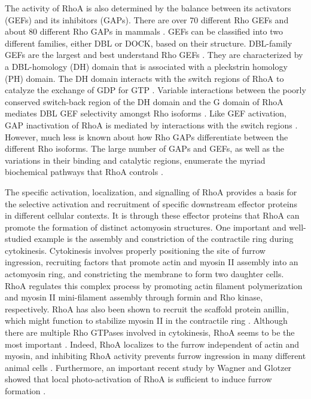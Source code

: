 \documentclass{ucetd}
\begin{document}
The activity of RhoA is also determined by the balance between its activators (GEFs) and its inhibitors (GAPs).  There are over 70 different Rho GEFs and about 80 different Rho GAPs in mammals \cite{Cherfils:2013ks}.  GEFs can be classified into two different families, either DBL or DOCK, based on their structure.  DBL-family GEFs are the largest and best understand Rho GEFs \cite{Rossman:2005do}.  They are characterized by a DBL-homology (DH) domain that is associated with a pleckstrin homology (PH) domain.  The DH domain interacts with the switch regions of RhoA to catalyze the exchange of GDP for GTP \cite{Rossman:2005do}.  Variable interactions between the poorly conserved switch-back region of the DH domain and the G domain of RhoA mediates DBL GEF selectivity amongst Rho isoforms \cite{Rossman:2005do, Schaefer:2014ez}.  Like GEF activation, GAP inactivation of RhoA is mediated by interactions with the switch regions \cite{Cherfils:2013ks}.  However, much less is known about how Rho GAPs differentiate between the different Rho isoforms.  The large number of GAPs and GEFs, as well as the variations in their binding and catalytic regions, enumerate the myriad biochemical pathways that RhoA controls \cite{Schaefer:2014ez}.  


The specific activation, localization, and signalling of RhoA provides a basis for the selective activation and recruitment of specific downstream effector proteins in different cellular contexts.  It is through these effector proteins that RhoA can promote the formation of distinct actomyosin structures.  One important and well-studied example is the assembly and constriction of the contractile ring during cytokinesis.  Cytokinesis involves properly positioning the site of furrow ingression, recruiting factors that promote actin and myosin II assembly into an actomyosin ring, and constricting the membrane to form two daughter cells.  RhoA regulates this complex process by promoting actin filament polymerization and myosin II mini-filament assembly through formin and Rho kinase, respectively.  RhoA has also been shown to recruit the scaffold protein anillin, which might function to stabilize myosin II in the contractile ring \cite{Piekny:2008jf}.  Although there are multiple Rho GTPases involved in cytokinesis, RhoA seems to be the most important \cite{Piekny:2005dw}.  Indeed, RhoA localizes to the furrow independent of actin and myosin, and inhibiting RhoA activity prevents furrow ingression in many different animal cells  \cite{Yuce:2005hz, Piekny:2005dw}.  Furthermore, an important recent study by Wagner and Glotzer showed that local photo-activation of RhoA is sufficient to induce furrow formation \cite{Wagner:2016ev}.  
\end{document}
